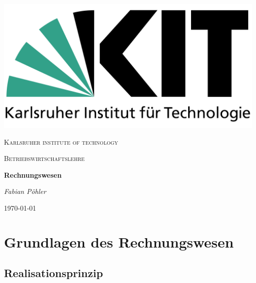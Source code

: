 \documentclass{article}
\begin{document}
\begin{titlepage}
	\centering
	\includegraphics[scale=0.1]{KIT.png} \par\vspace{4cm}
	{\scshape\LARGE Karlsruher institute of technology \par}
	\vspace{1cm}
	{\scshape\Large Betriebswirtschaftslehre\par}
	\vspace{1.5cm}
	{\huge\bfseries Rechnungswesen\par}
	\vspace{2cm}
	{\Large\itshape Fabian Pöhler\par}
	\vfill
	
	\vfill

	{\large \today\par}
\end{titlepage}
\newpage
\tableofcontents
\newpage

\section{Grundlagen des Rechnungswesen}

\subsection{Realisationsprinzip}
\end{document}
